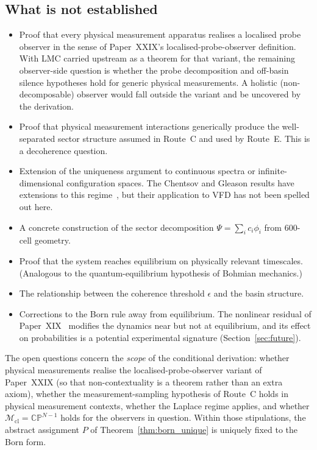 \documentclass[12pt]{article}
\newcommand{\Mcl}{\mathcal{M}_{\mathrm{cl}}}
\begin{document}
\subsection{What is not established}

\begin{itemize}
    \item Proof that every physical measurement apparatus realises a localised probe observer in the sense of Paper~XXIX's localised-probe-observer definition. With LMC carried upstream as a theorem for that variant, the remaining observer-side question is whether the probe decomposition and off-basin silence hypotheses hold for generic physical measurements. A holistic (non-decomposable) observer would fall outside the variant and be uncovered by the derivation.
    \item Proof that physical measurement interactions generically produce the well-separated sector structure assumed in Route~C and used by Route~E. This is a decoherence question.
    \item Extension of the uniqueness argument to continuous spectra or infinite-dimensional configuration spaces. The Chentsov and Gleason results have extensions to this regime~\citep{Petz1996}, but their application to VFD has not been spelled out here.
    \item A concrete construction of the sector decomposition $\Psi = \sum_i c_i \phi_i$ from 600-cell geometry.
    \item Proof that the system reaches equilibrium on physically relevant timescales. (Analogous to the quantum-equilibrium hypothesis of Bohmian mechanics.)
    \item The relationship between the coherence threshold $\epsilon$ and the basin structure.
    \item Corrections to the Born rule away from equilibrium. The nonlinear residual of Paper~XIX~\citep{SmartXIX} modifies the dynamics near but not at equilibrium, and its effect on probabilities is a potential experimental signature (Section~\ref{sec:future}).
\end{itemize}

The open questions concern the \emph{scope} of the conditional derivation: whether physical measurements realise the localised-probe-observer variant of Paper~XXIX (so that non-contextuality is a theorem rather than an extra axiom), whether the measurement-sampling hypothesis of Route~C holds in physical measurement contexts, whether the Laplace regime applies, and whether $\Mcl = \mathbb{CP}^{N-1}$ holds for the observers in question. Within those stipulations, the abstract assignment $P$ of Theorem~\ref{thm:born_unique} is uniquely fixed to the Born form.
\end{document}
